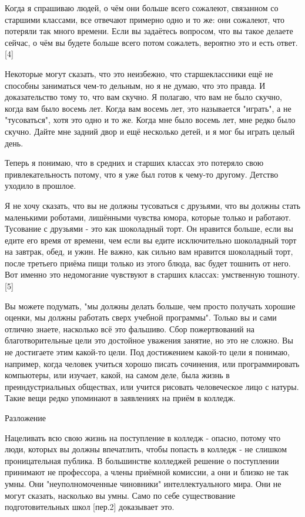 \documentclass[ebook,12pt,oneside,openany]{memoir}
\begin{document}
Когда я спрашиваю людей, о чём они больше всего сожалеют, связанном со
старшими классами, все отвечают примерно одно и то же: они сожалеют,
что потеряли так много времени. Если вы задаётесь вопросом, что вы
такое делаете сейчас, о чём вы будете больше всего потом сожалеть,
вероятно это и есть ответ. [4]

Некоторые могут сказать, что это неизбежно, что старшеклассники ещё не
способны заниматься чем-то дельным, но я не думаю, что это правда. И
доказательство тому то, что вам скучно. Я полагаю, что вам не было
скучно, когда вам было восемь лет. Когда вам восемь лет, это
называется "играть", а не "тусоваться", хотя это одно и то же. Когда
мне было восемь лет, мне редко было скучно. Дайте мне задний двор и
ещё несколько детей, и я мог бы играть целый день.

Теперь я понимаю, что в средних и старших классах это потеряло свою
привлекательность потому, что я уже был готов к чему-то другому.
Детство уходило в прошлое.

Я не хочу сказать, что вы не должны тусоваться с друзьями, что вы
должны стать маленькими роботами, лишёнными чувства юмора, которые
только и работают. Тусование с друзьями - это как шоколадный торт. Он
нравится больше, если вы едите его время от времени, чем если вы едите
исключительно шоколадный торт на завтрак, обед, и ужин. Не важно, как
сильно вам нравится шоколадный торт, после третьего приёма пищи только
из этого блюда, вас будет тошнить от него. Вот именно это недомогание
чувствуют в старших классах: умственную тошноту.[5]

Вы можете подумать, "мы должны делать больше, чем просто получать
хорошие оценки, мы должны работать сверх учебной программы". Только вы
и сами отлично знаете, насколько всё это фальшиво. Сбор пожертвований
на благотворительные цели это достойное уважения занятие, но это не
сложно. Вы не достигаете этим какой-то цели. Под достижением какой-то
цели я понимаю, например, когда человек учиться хорошо писать
сочинения, или программировать компьютеры, или изучает, какой, на
самом деле, была жизнь в преиндустриальных обществах, или учится
рисовать человеческое лицо с натуры. Такие вещи редко упоминают в
заявлениях на приём в колледж.

Разложение

Нацеливать всю свою жизнь на поступление в колледж - опасно, потому
что люди, которых вы должны впечатлить, чтобы попасть в колледж - не
слишком проницательная публика. В большинстве колледжей решение о
поступлении принимают не профессора, а члены приёмной комиссии, а они
и близко не так умны. Они "неуполномоченные чиновники"
интеллектуального мира. Они не могут сказать, насколько вы умны. Само
по себе существование подготовительных школ [пер.2] доказывает это.
\end{document}
